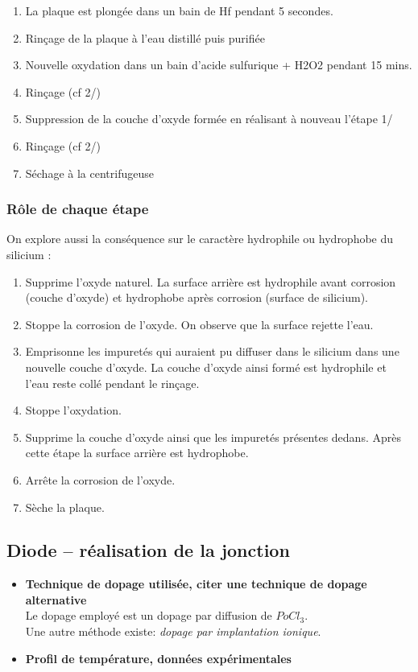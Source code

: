 \documentclass[11pt]{article}
\begin{document}
\begin{enumerate}\itemsep -2pt
\item La plaque est plong\'ee dans un bain de Hf pendant 5 secondes.
\item Rin\c cage de la plaque \`a l'eau distill\'e puis purifi\'ee
\item Nouvelle oxydation dans un bain d'acide sulfurique + H2O2 pendant 15 mins. 
\item Rin\c cage (cf 2/)
\item Suppression de la couche d'oxyde form\'ee en r\'ealisant \`a nouveau l'\'etape 1/
\item Rin\c cage (cf 2/)
\item S\'echage \`a la centrifugeuse
\end{enumerate}

\subsubsection{R\^ole de chaque \'etape}
On explore aussi la cons\'equence sur le caract\`ere hydrophile ou hydrophobe du silicium :

\begin{enumerate}\itemsep -2pt
\item Supprime l'oxyde naturel. La surface arri\`ere est hydrophile avant corrosion (couche d'oxyde) et hydrophobe apr\`es corrosion (surface de silicium).
\item Stoppe la corrosion de l'oxyde. On observe que la surface rejette l'eau.
\item  Emprisonne les impuret\'es qui auraient pu diffuser dans le silicium dans une nouvelle couche d'oxyde. La couche d'oxyde ainsi form\'e est hydrophile et l'eau reste coll\'e pendant le rin\c cage.
\item Stoppe l'oxydation.
\item Supprime la couche d'oxyde ainsi que les impuret\'es pr\'esentes dedans. Apr\`es cette \'etape la surface arri\`ere est hydrophobe.
\item Arr\^ete la corrosion de l'oxyde. 
\item S\`eche la plaque.
\end{enumerate}


\subsection{Diode -- r\'ealisation de la jonction}

\begin{itemize}

\item \textbf{Technique de dopage utilis\'ee, citer une technique de dopage alternative }\\
Le dopage employ\'e est un dopage par diffusion de $PoCl_3$. \\ Une autre m\'ethode existe: \textit{dopage par implantation ionique}. 

\item \textbf{Profil de temp\'erature, donn\'ees exp\'erimentales}

\end{itemize}
\end{document}
